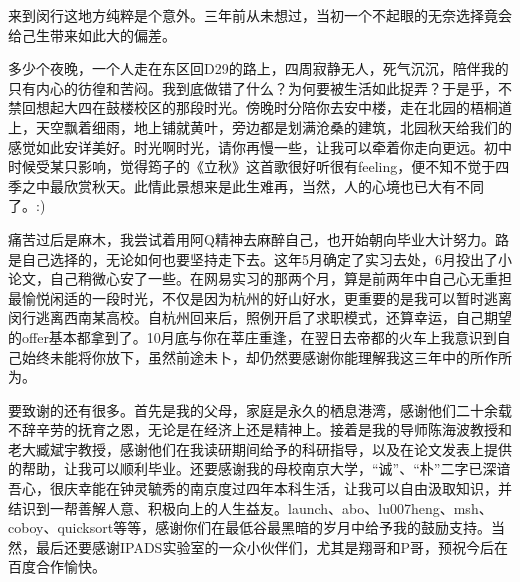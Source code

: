 
\begin{thanks}
\iffalse
感谢Donald Knuth！

感谢Leslie Lamport！

感谢\LaTeX！

感谢ex！

感谢导师！

感谢NJU！

感谢父母！

感谢上帝！
\fi
来到闵行这地方纯粹是个意外。三年前从未想过，当初一个不起眼的无奈选择竟会给己生带来如此大的偏差。

多少个夜晚，一个人走在东区回D29的路上，四周寂静无人，死气沉沉，陪伴我的只有内心的彷徨和苦闷。我到底做错了什么？为何要被生活如此捉弄？于是乎，不禁回想起大四在鼓楼校区的那段时光。傍晚时分陪你去安中楼，走在北园的梧桐道上，天空飘着细雨，地上铺就黄叶，旁边都是划满沧桑的建筑，北园秋天给我们的感觉如此安详美好。时光啊时光，请你再慢一些，让我可以牵着你走向更远。初中时候受某只影响，觉得筠子的《立秋》这首歌很好听很有feeling，便不知不觉于四季之中最欣赏秋天。此情此景想来是此生难再，当然，人的心境也已大有不同了。:)

痛苦过后是麻木，我尝试着用阿Q精神去麻醉自己，也开始朝向毕业大计努力。路是自己选择的，无论如何也要坚持走下去。这年5月确定了实习去处，6月投出了小论文，自己稍微心安了一些。在网易实习的那两个月，算是前两年中自己心无重担最愉悦闲适的一段时光，不仅是因为杭州的好山好水，更重要的是我可以暂时逃离闵行逃离西南某高校。自杭州回来后，照例开启了求职模式，还算幸运，自己期望的offer基本都拿到了。10月底与你在莘庄重逢，在翌日去帝都的火车上我意识到自己始终未能将你放下，虽然前途未卜，却仍然要感谢你能理解我这三年中的所作所为。

要致谢的还有很多。首先是我的父母，家庭是永久的栖息港湾，感谢他们二十余载不辞辛劳的抚育之恩，无论是在经济上还是精神上。接着是我的导师陈海波教授和老大臧斌宇教授，感谢他们在我读研期间给予的科研指导，以及在论文发表上提供的帮助，让我可以顺利毕业。还要感谢我的母校南京大学，``诚''、``朴''二字已深谙吾心，很庆幸能在钟灵毓秀的南京度过四年本科生活，让我可以自由汲取知识，并结识到一帮善解人意、积极向上的人生益友。launch、abo、lu007heng、msh、coboy、quicksort等等，感谢你们在最低谷最黑暗的岁月中给予我的鼓励支持。当然，最后还要感谢IPADS实验室的一众小伙伴们，尤其是翔哥和P哥，预祝今后在百度合作愉快。


\end{thanks}
